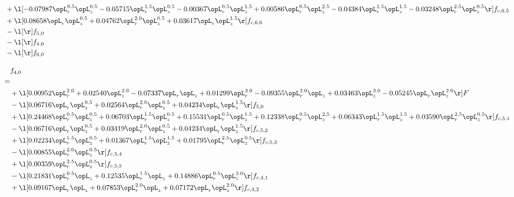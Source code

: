 \begin{alignat}{2}
& + \l[  -0.07987 \opL_r^{0.5} \opL_z^{0.5}   -0.05715 \opL_r^{1.5} \opL_z^{0.5}   -0.00367 \opL_r^{0.5} \opL_z^{1.5} +  0.00586 \opL_r^{0.5} \opL_z^{2.5}   -0.04384 \opL_r^{1.5} \opL_z^{1.5}   -0.03248 \opL_r^{2.5} \opL_z^{0.5}  \r] f_{c,6,5} \nonumber \\ 
& + \l[  0.08658 \opL_r \opL_z^{0.5} +  0.04762 \opL_r^{2.0} \opL_z^{0.5} +  0.03617 \opL_r \opL_z^{1.5}  \r] f_{c,6,6} \nonumber \\ 
& - \l[  \r] f_{5,0} \nonumber \\ 
& - \l[  \r] f_{4,0} \nonumber \\ 
& - \l[  \r] f_{6,0} \nonumber \\ 
\end{alignat} 


\begin{alignat}{2} 
\label{eq:f_40_2} 
& f_{4,0} \nonumber \\ 
 = \\ 
& + \l[  0.00952 \opL_r^{2.0} +  0.02540 \opL_z^{2.0}   -0.07337 \opL_r \opL_z +  0.01299 \opL_r^{3.0}   -0.09355 \opL_r^{2.0} \opL_z +  0.03463 \opL_z^{3.0}   -0.05245 \opL_r \opL_z^{2.0}  \r] F \nonumber \\ 
& - \l[  0.06716 \opL_r \opL_z^{0.5} +  0.02564 \opL_r^{2.0} \opL_z^{0.5} +  0.04234 \opL_r \opL_z^{1.5}  \r] f_{5,0} \nonumber \\ 
& + \l[  0.24468 \opL_r^{0.5} \opL_z^{0.5} +  0.06703 \opL_r^{1.5} \opL_z^{0.5} +  0.15531 \opL_r^{0.5} \opL_z^{1.5} +  0.12338 \opL_r^{0.5} \opL_z^{2.5} +  0.06343 \opL_r^{1.5} \opL_z^{1.5} +  0.03590 \opL_r^{2.5} \opL_z^{0.5}  \r] f_{c,5,1} \nonumber \\ 
& - \l[  0.06716 \opL_r \opL_z^{0.5} +  0.03419 \opL_r^{2.0} \opL_z^{0.5} +  0.04234 \opL_r \opL_z^{1.5}  \r] f_{c,5,2} \nonumber \\ 
& + \l[  0.02234 \opL_r^{1.5} \opL_z^{0.5} +  0.01367 \opL_r^{1.5} \opL_z^{1.5} +  0.01795 \opL_r^{2.5} \opL_z^{0.5}  \r] f_{c,5,3} \nonumber \\ 
& - \l[  0.00855 \opL_r^{2.0} \opL_z^{0.5}  \r] f_{c,5,4} \nonumber \\ 
& + \l[  0.00359 \opL_r^{2.5} \opL_z^{0.5}  \r] f_{c,5,5} \nonumber \\ 
& - \l[  0.21831 \opL_r^{0.5} \opL_z +  0.12535 \opL_r^{1.5} \opL_z +  0.14886 \opL_r^{0.5} \opL_z^{2.0}  \r] f_{c,4,1} \nonumber \\ 
& + \l[  0.09167 \opL_r \opL_z +  0.07853 \opL_r^{2.0} \opL_z +  0.07172 \opL_r \opL_z^{2.0}  \r] f_{c,4,2} \nonumber \\ 

\end{alignat}
